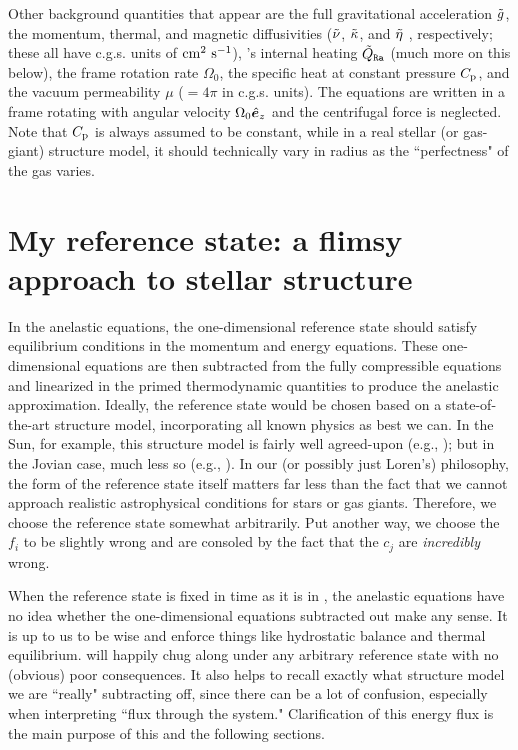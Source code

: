 \documentclass[12pt]{article}
\numberwithin{equation}{section}
\begin{document}
	Other background quantities that appear are the full gravitational acceleration $\tilde{g}$, the momentum, thermal, and magnetic diffusivities ($\tilde{\nu}$, $\tilde{\kappa}$, and $\tilde{\eta}$ , respectively; these all have c.g.s. units of $\rm{cm^2\ s^{-1}}$), {\rayleigh}'s internal heating $\tilde{Q}_{\texttt{Ra}}$ (much more on this below), the frame rotation rate $\Omega_0$, the specific heat at constant pressure $C_{\rm{p}}$, and the vacuum permeability $\mu$ ($=4\pi$ in c.g.s. units). The equations are written in a frame rotating with angular velocity $\Omega_0\hat{\bm{e}}_z$ and the centrifugal force is neglected. Note that $C_{\rm{p}}$ is always assumed to be constant, while in a real stellar (or gas-giant) structure model, it should technically vary in radius as the ``perfectness" of the gas varies. 
	
	\section{My reference state: a flimsy approach to stellar structure}\label{sec:ref}
	In the anelastic equations, the one-dimensional reference state should satisfy equilibrium conditions in the momentum and energy equations. These one-dimensional equations are then subtracted from the fully compressible equations and linearized in the primed thermodynamic quantities to produce the anelastic approximation. Ideally, the reference state would be chosen based on a state-of-the-art structure model, incorporating all known physics as best we can. In the Sun, for example, this structure model is fairly well agreed-upon (e.g., \citealt{ChristensenDalsgaard1996}); but in the Jovian case, much less so (e.g., \citealt{Guillot2005}). In our (or possibly just Loren's) philosophy, the form of the reference state itself matters far less than the fact that we cannot approach realistic astrophysical conditions for stars or gas giants. Therefore, we choose the reference state somewhat arbitrarily. Put another way, we choose the $f_i$ to be slightly wrong and are consoled by the fact that the $c_j$ are \textit{incredibly} wrong. 
	
	When the reference state is fixed in time as it is in {\rayleigh}, the anelastic equations have no idea whether the one-dimensional equations subtracted out make any sense. It is up to us to be wise and enforce things like hydrostatic balance and thermal equilibrium. {\rayleigh} will happily chug along under any arbitrary reference state with no (obvious) poor consequences. It also helps to recall exactly what structure model we are ``really" subtracting off, since there can be a lot of confusion, especially when interpreting ``flux through the system." Clarification of this energy flux is the main purpose of this and the following sections. 
	
\end{document}
